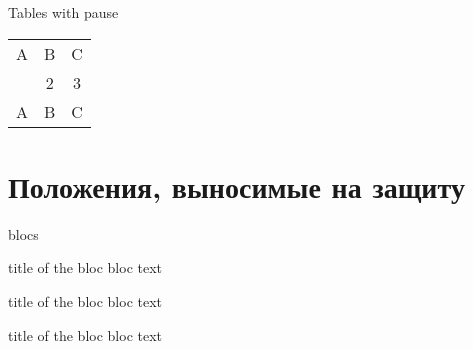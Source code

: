 \documentclass{beamer}
\begin{document}
\begin{frame}{Tables with pause}
\begin{tabular}{c c c}
A & B & C \\ 
\pause 
1 & 2 & 3 \\  
\pause 
A & B & C \\ 
\end{tabular}
\end{frame}


\section{Положения, выносимые на защиту}
\begin{frame}{blocs}

\begin{block}{title of the bloc}
bloc text
\end{block}

\begin{exampleblock}{title of the bloc}
bloc text
\end{exampleblock}


\begin{alertblock}{title of the bloc}
bloc text
\end{alertblock}
\end{frame}
\end{document}
